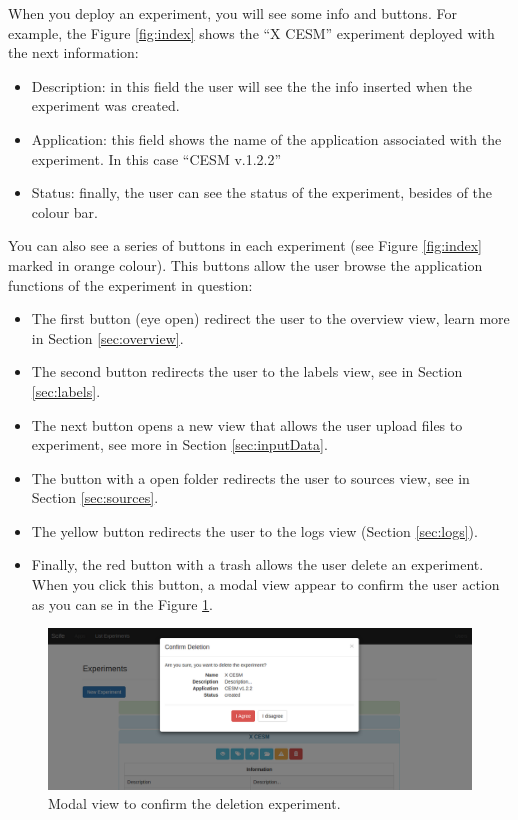 \documentclass[11pt]{article}
\begin{document}
When you deploy an experiment, you will see some info and buttons. For example, the Figure \ref{fig:index} shows the ``X CESM'' experiment deployed with the next information:
\begin{itemize}
	\item Description: in this field the user will see the the info inserted when the experiment was created.
	\item Application: this field shows the name of the application associated with the experiment. In this case ``CESM v.1.2.2''
	\item Status: finally, the user can see the status of the experiment, besides of the colour bar.
\end{itemize}

You can also see a series of buttons in each experiment (see Figure \ref{fig:index} marked in orange colour). This buttons allow the user browse the application functions of the experiment in question:
\begin{itemize}
	\item The first button (eye open) redirect the user to the overview view, learn more in Section \ref{sec:overview}.
	\item The second button redirects the user to the labels view, see in Section \ref{sec:labels}.
	\item The next button opens a new view that allows the user upload files to experiment, see more in Section \ref{sec:inputData}.
	\item The button with a open folder redirects the user to sources view, see in Section \ref{sec:sources}.
	\item The yellow button redirects the user to the logs view (Section \ref{sec:logs}).
	\item Finally, the red button with a trash allows the user delete an experiment. When you click this button, a modal view appear to confirm the user action as you can se in the Figure \ref{fig:index-delete}. 
\end{itemize}

\begin{figure}[htp]
\centering
\includegraphics[width=\linewidth]{img/index-delete}
\caption{Modal view to confirm the deletion experiment.}
\label{fig:index-delete}
\end{figure}
\end{document}
